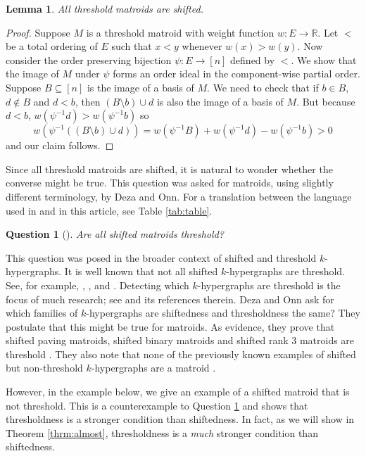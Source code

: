 \documentclass{amsart}
\theoremstyle{definition}
\theoremstyle{plain}
\newtheorem{lemma}[defn]{Lemma}
\newtheorem{question}[defn]{Question}
\newcommand{\R}{\mathbb{R}}
\begin{document}
\begin{lemma}
  \label{lem:shift->thresh}
All threshold matroids are shifted.
\end{lemma}
\begin{proof}
  Suppose $M$ is a threshold matroid with weight function $w:E\to \R$. Let $<$ be a total ordering of $E$ such that $x<y$ whenever $w(x)> w(y)$. Now consider the order preserving bijection $\psi:E\to [n]$ defined by $<$. We show that the image of $M$ under $\psi$ forms an order ideal in the component-wise partial order. Suppose $B\subseteq [n]$ is the image of a basis of $M$. We need to check that if $b\in B$, $d\not\in B$ and $d<b$, then $(B\setminus b) \cup d$ is also the image of a basis of $M$. But because $d<b$, $w(\psi^{-1}d)>w(\psi^{-1}b)$ so \[w(\psi^{-1}((B\setminus b) \cup d)) = w(\psi^{-1}B)+w(\psi^{-1}d)-w(\psi^{-1}b)>0\]
  and our claim follows.
\end{proof}

Since all threshold matroids are shifted, it is natural to wonder whether the converse might be true. This question was asked for matroids, using slightly different terminology, by Deza and Onn. For a translation between the language used in \cite{DO} and in this article, see Table \ref{tab:table}.
\begin{question}[{\cite[Question $7.2$]{DO}}]
\label{q:thresh}
Are all shifted matroids threshold?
\end{question}

This question was posed in the broader context of shifted and threshold $k$-hypergraphs. It is well known that not all shifted $k$-hypergraphs are threshold. See, for example,  \cite[Theorem $3.1$]{KR}, \cite[Example $2.2$]{RRST}, \cite[Theorem $7.3.3$]{Muroga} and \cite[Example $2.15$]{BS}. Detecting which $k$-hypergraphs are threshold is the focus of much research; see \cite[Chapter $9$]{Boolean} and its references therein. Deza and Onn ask for which families of $k$-hypergraphs are shiftedness and thresholdness the same? They postulate that this might be true for matroids. As evidence, they prove that shifted paving matroids, shifted binary matroids and shifted rank $3$ matroids are threshold \cite[Theorems $5.1$, $5.4$ and $5.5$]{DO}. They also note that none of the previously known examples of shifted but non-threshold $k$-hypergraphs are a matroid \cite[Section $6$]{DO}. 

However, in the example below, we give an example of a shifted matroid that is not threshold. This is a counterexample to Question \ref{q:thresh} and shows that thresholdness is a stronger condition than shiftedness. In fact, as we will show in Theorem \ref{thrm:almost}, thresholdness is a \emph{much} stronger condition than shiftedness.
\end{document}
